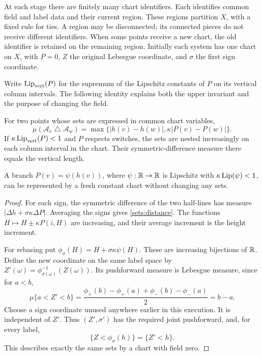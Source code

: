 At each stage there are finitely many chart identifiers. Each identifies
common field and label data and their current region. These regions
partition $X$, with a fixed rule for ties. A region may be disconnected;
its connected pieces do not receive different identifiers. When some
points receive a new chart, the old identifier is retained on the
remaining region. Initially each system has one chart on $X$, with
$P=0$, $Z$ the original Lebesgue coordinate, and $\sigma$ the first sign
coordinate.

Write $\operatorname{Lip}_{\mathrm{vert}}(P)$ for the supremum of the Lipschitz constants
of $P$ on its vertical column intervals. The following identity explains
both the upper invariant and the purpose of changing the field.

\begin{lemma}\label{sets:vertical}
For two points whose sets are expressed in common chart variables,
\begin{equation}\label{sets:distance}
 \mu(\mathcal A_v\mathbin\triangle\mathcal A_w)
   =\max\{|h(v)-h(w)|,\kappa|P(v)-P(w)|\}.
\end{equation}
If $\kappa\operatorname{Lip}_{\mathrm{vert}}(P)<1$ and $P$ respects switches, the sets are
nested increasingly on each column interval in the chart. Their
symmetric-difference measure there equals the vertical length.

A branch $P(v)=\psi(h(v))$, where $\psi:\mathbb R\to\mathbb R$ is Lipschitz with
$\kappa\operatorname{Lip}(\psi)<1$, can be represented by a fresh constant chart without
changing any sets.
\end{lemma}
\begin{proof}
For each sign, the symmetric difference of the two half-lines has measure
$|\Delta h+\sigma\kappa\Delta P|$. Averaging the signs gives
\eqref{sets:distance}. The functions $H\mapsto H\pm\kappa P(i,H)$
are increasing, and their average increment is the height increment.

For rebasing put $\phi_\sigma(H)=H+\sigma\kappa\psi(H)$.
These are increasing bijections of $\mathbb R$. Define the new coordinate on the
same label space by $Z'(\omega)=\phi_{\sigma(\omega)}^{-1}(Z(\omega))$.
Its pushforward measure is Lebesgue measure, since for $a<b$,
\[
 \mu\{a<Z'<b\}
 =\frac{\phi_+(b)-\phi_+(a)+\phi_-(b)-\phi_-(a)}2=b-a.
\]
Choose a sign coordinate unused anywhere earlier in this execution. It
is independent of $Z'$. Thus $(Z',\sigma')$ has the required joint
pushforward, and, for every label,
\[
 \{Z<\phi_\sigma(h)\}=\{Z'<h\}.
\]
This describes exactly the same sets by a chart with field zero.
\end{proof}

